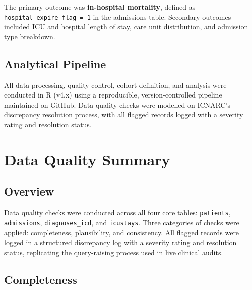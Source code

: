 \documentclass[
]{article}
\begin{document}
The primary outcome was \textbf{in-hospital mortality}, defined as
\texttt{hospital\_expire\_flag\ =\ 1} in the admissions table. Secondary
outcomes included ICU and hospital length of stay, care unit
distribution, and admission type breakdown.

\subsection{Analytical Pipeline}\label{analytical-pipeline}

All data processing, quality control, cohort definition, and analysis
were conducted in R (v4.x) using a reproducible, version-controlled
pipeline maintained on GitHub. Data quality checks were modelled on
ICNARC's discrepancy resolution process, with all flagged records logged
with a severity rating and resolution status.

\section{Data Quality Summary}\label{data-quality-summary}

\subsection{Overview}\label{overview}

Data quality checks were conducted across all four core tables:
\texttt{patients}, \texttt{admissions}, \texttt{diagnoses\_icd}, and
\texttt{icustays}. Three categories of checks were applied:
completeness, plausibility, and consistency. All flagged records were
logged in a structured discrepancy log with a severity rating and
resolution status, replicating the query-raising process used in live
clinical audits.

\subsection{Completeness}\label{completeness}
\end{document}

